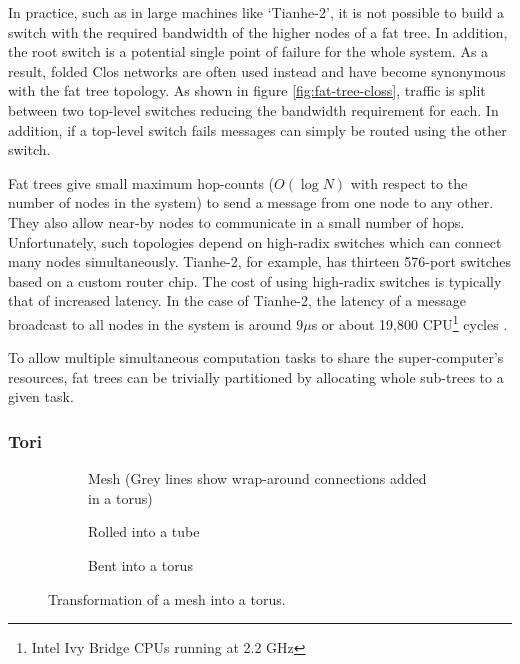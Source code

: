 				In practice, such as in large machines like `Tianhe-2', it is not
				possible to build a switch with the required bandwidth of the higher
				nodes of a fat tree. In addition, the root switch is a potential single
				point of failure for the whole system. As a result, folded Clos networks
				are often used instead and have become synonymous with the fat tree
				topology. As shown in figure \ref{fig:fat-tree-closs}, traffic is split
				between two top-level switches reducing the bandwidth requirement for
				each. In addition, if a top-level switch fails messages can simply be
				routed using the other switch.
				
				Fat trees give small maximum hop-counts ($O(\log{N})$ with respect to
				the number of nodes in the system) to send a message from one node to
				any other. They also allow near-by nodes to communicate in a small
				number of hops. Unfortunately, such topologies depend on high-radix
				switches which can connect many nodes simultaneously.  Tianhe-2, for
				example, has thirteen 576-port switches based on a custom router chip.
				The cost of using high-radix switches is typically that of increased
				latency. In the case of Tianhe-2, the latency of a message broadcast to
				all nodes in the system is around 9$\mu$s or about 19,800
				CPU\footnote{Intel Ivy Bridge CPUs running at 2.2 GHz} cycles
				\cite{dongarra13}.
				
				To allow multiple simultaneous computation tasks to share the
				super-computer's resources, fat trees can be trivially partitioned by
				allocating whole sub-trees to a given task.
			
			\subsubsection{Tori}
				
				\begin{figure}
					\begin{subfigure}[t]{\textwidth}
						\center
						
						\caption{Mesh (Grey lines show wrap-around connections added in a
						torus)}
						\label{fig:torus-flat}
					\end{subfigure}
					
					\vspace{1em}
					
					\begin{subfigure}[t]{\textwidth}
						\center
						
						\caption{Rolled into a tube}
						\label{fig:torus-pipe}
					\end{subfigure}
					
					\vspace{1em}
					
					\begin{subfigure}[t]{\textwidth}
						\center
						
						\caption{Bent into a torus}
						\label{fig:torus-3D}
					\end{subfigure}
					
					\caption{Transformation of a mesh into a torus.}
					\label{fig:forming-a-torus}
				\end{figure}
			

